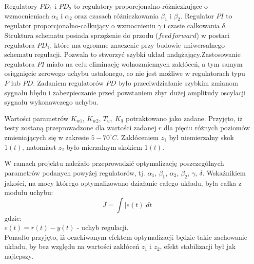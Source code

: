 Regulatory $PD_1$ i $PD_2$ to regulatory proporcjonalno-różniczkujące o wzmocnieniach $\alpha_1$ i $\alpha_2$ oraz czasach różniczkowania $\beta_1$ i $\beta_2$. Regulator $PI$ to regulator proporcjonalno-całkujący o wzmocnieniu $\gamma$ i czasie całkowania $\delta$.
Struktura schematu posiada sprzężenie do przodu ($feedforward$) w postaci regulatora $PD_1$, które ma ogromne znaczenie przy budowie uniwersalnego schematu regulacji. Pozwala to stworzyć szybki układ nadążający.Zastosowanie regulatora $PI$ miało na celu eliminację wolnozmiennych zakłóceń, a tym samym osiągnięcie zerowego uchybu ustalonego, co nie jest możliwe w regulatorach typu $P$ lub $PD$. Zadaniem regulatorów $PD$ było przeciwdziałanie szybkim zmianom sygnału błędu i zabezpieczanie przed powstaniem zbyt dużej amplitudy oscylacji sygnału wykonawczego uchybu.

 Wartości parametrów $K_{w1}$, $K_{w2}$, $T_w$, $K_0$ potraktowano jako zadane. Przyjęto, iż testy zostaną przeprowadzone dla wartości zadanej $r$ dla pięciu różnych poziomów zmieniających się w zakresie $5-70^{\circ} C$. Zakłóceniem $z_1$ był niemierzalny skok $1(t)$, natomiast $z_2$ było mierzalnym skokiem $1(t)$.  

W ramach projektu należało przeprowadzić optymalizację poszczególnych parametrów podanych powyżej regulatorów, tj. $\alpha_1$, $\beta_1$, $\alpha_2$, $\beta_2$, $\gamma$, $\delta$. Wskaźnikiem jakości, na mocy którego optymalizowano działanie całego układu, była całka z modułu uchybu:
\begin{equation}\label{wsk_jak}
J = \int |e(t)| dt
\end{equation}
gdzie: \\
$e(t) = r(t) - y(t)$ - uchyb regulacji.\\ 

 Ponadto przyjęto, iż oczekiwanym efektem optymalizacji będzie takie zachowanie układu, by bez względu na wartości zakłóceń $z_1$ i $z_2$, efekt stabilizacji był jak najlepszy.

